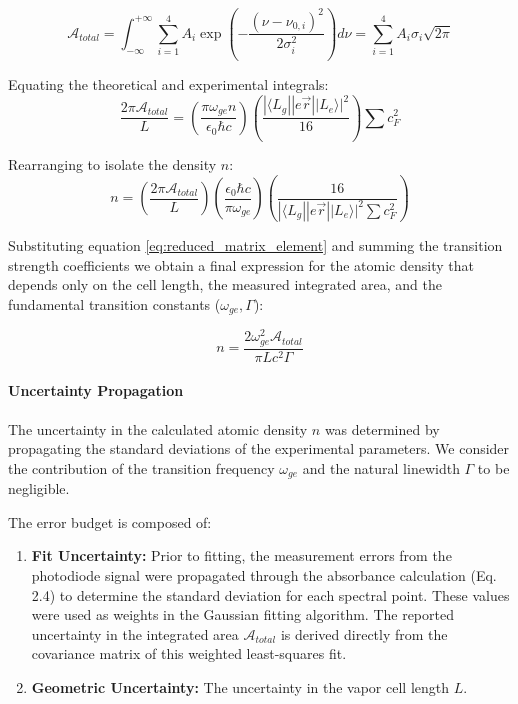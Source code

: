 \begin{equation}
    \mathcal{A}_{total} = \int_{-\infty}^{+\infty} \sum_{i=1}^{4} A_i \exp\left(-\frac{(\nu - \nu_{0,i})^2}{2\sigma_i^2}\right) d\nu = \sum_{i=1}^{4} A_i \sigma_i \sqrt{2\pi}
\end{equation}

Equating the theoretical and experimental integrals:
\begin{equation}
    \frac{2\pi \mathcal{A}_{total}}{L} = \left( \frac{\pi \omega_{ge} n}{\epsilon_0 \hbar c} \right) \left( \frac{|\langle L_g || e\vec{r} || L_e \rangle|^2}{16} \right) \sum c_F^2
\end{equation}

Rearranging to isolate the density $n$:
\begin{equation}
    n = \left( \frac{2\pi \mathcal{A}_{total}}{L} \right) \left( \frac{\epsilon_0 \hbar c}{\pi \omega_{ge}} \right) \left( \frac{16}{|\langle L_g || e\vec{r} || L_e \rangle|^2 \sum c_F^2} \right)
\end{equation}


Substituting equation \ref{eq:reduced_matrix_element} and summing the transition strength coefficients we obtain a final expression for the atomic density that depends only on the cell length, the measured integrated area, and the fundamental transition constants ($\omega_{ge}, \Gamma$):

\begin{equation}
    n = \frac{2 \omega_{ge}^2 \mathcal{A}_{total}}{\pi L c^2 \Gamma}
    \label{eq:density_formula}
\end{equation}


\paragraph{Uncertainty Propagation}
The uncertainty in the calculated atomic density $n$ was determined by propagating the standard deviations of the experimental parameters. We consider the contribution of the transition frequency $\omega_{ge}$ and the natural linewidth $\Gamma$ to be negligible.

The error budget is composed of:
\begin{enumerate}
    \item \textbf{Fit Uncertainty:} Prior to fitting, the measurement errors from the photodiode signal were propagated through the absorbance calculation (Eq. 2.4) to determine the standard deviation for each spectral point. These values were used as weights in the Gaussian fitting algorithm. The reported uncertainty in the integrated area $\mathcal{A}_{total}$ is derived directly from the covariance matrix of this weighted least-squares fit.
    \item \textbf{Geometric Uncertainty:} The uncertainty in the vapor cell length $L$.
\end{enumerate}

